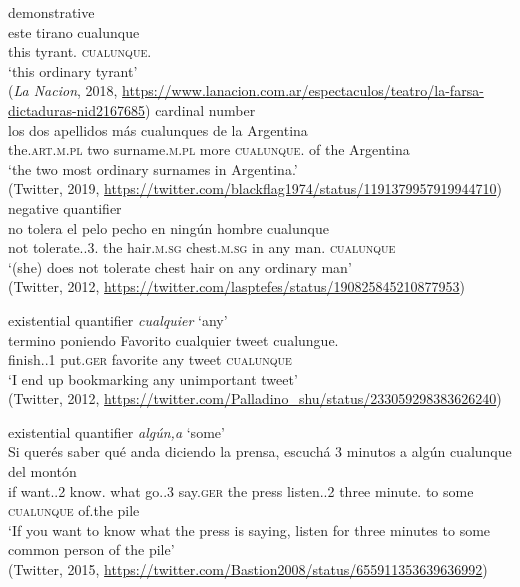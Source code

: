 \documentclass[output=paper,colorlinks,citecolor=brown]{langscibook}
\begin{document}
\ea\label{ex:fk39} demonstrative\\
    \gll este tirano cualunque\\
    this tyrant.\SG{} \textsc{cualunque}.\SG{}\\
    \glt ‘this ordinary tyrant’\\
    (\textit{La Nacion}, 2018, \url{https://www.lanacion.com.ar/espectaculos/teatro/la-farsa-dictaduras-nid2167685})
\ex\label{ex:fk40} cardinal number\\
    \gll los dos apellidos más cualunques de la Argentina\\
    the.\textsc{art.m.pl} two surname.\textsc{m.pl} more \textsc{cualunque}.\PL{} of the Argentina\\
    \glt ‘the two most ordinary surnames in Argentina.’\\
    (Twitter, 2019, \url{https://twitter.com/blackflag1974/status/1191379957919944710})
\ex \label{ex:fk41} negative quantifier\\
    \gll no tolera el pelo pecho en ningún hombre cualunque\\
    not tolerate.\PRS.3.\SG{} the hair.\textsc{m.sg} chest.\textsc{m.sg} in any man.\SG{} \textsc{cualunque}\\
    \glt ‘(she) does not tolerate chest hair on any ordinary man’\\
    (Twitter, 2012, \url{https://twitter.com/lasptefes/status/190825845210877953})

\ex\label{ex:fk42} existential quantifier \textit{cualquier} ‘any’\\\largerpage[1.5]
    \gll termino poniendo Favorito cualquier tweet cualungue.\\
    finish.\PRS.1\SG{} put.\textsc{ger} favorite any tweet \textsc{cualunque}\\
    \glt ‘I end up bookmarking any unimportant tweet’\\
    (Twitter, 2012, \url{https://twitter.com/Palladino_shu/status/233059298383626240})

\ex\label{ex:fk43} existential quantifier \textit{algún,a} ‘some’\\
    \gll Si querés saber qué anda diciendo la prensa, escuchá 3 minutos a algún cualunque del montón\\
    if want.\PRS.2\SG{} know.\INF{} what go.\PRS.3\SG{} say.\textsc{ger} the press listen.\IMP.2\SG{} three minute.\PL{} to some \textsc{cualunque} of.the pile\\
    \glt ‘If you want to know what the press is saying, listen for three minutes to some common person of the pile’\\
    (Twitter, 2015, \url{https://twitter.com/Bastion2008/status/655911353639636992})
\end{document}
